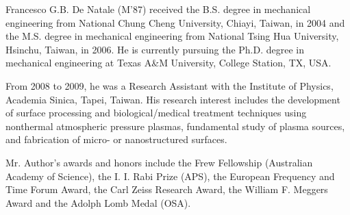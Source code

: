 \documentclass{ieeeaccess}
\begin{document}
\begin{IEEEbiography}{Francesco G.B. De Natale} (M'87) received the B.S. degree in mechanical 
engineering from National Chung Cheng University, Chiayi, Taiwan, in 2004 
and the M.S. degree in mechanical engineering from National Tsing Hua 
University, Hsinchu, Taiwan, in 2006. He is currently pursuing the Ph.D. 
degree in mechanical engineering at Texas A{\&}M University, College 
Station, TX, USA.

From 2008 to 2009, he was a Research Assistant with the Institute of 
Physics, Academia Sinica, Tapei, Taiwan. His research interest includes the 
development of surface processing and biological/medical treatment 
techniques using nonthermal atmospheric pressure plasmas, fundamental study 
of plasma sources, and fabrication of micro- or nanostructured surfaces. 

Mr. Author's awards and honors include the Frew Fellowship (Australian 
Academy of Science), the I. I. Rabi Prize (APS), the European Frequency and 
Time Forum Award, the Carl Zeiss Research Award, the William F. Meggers 
Award and the Adolph Lomb Medal (OSA).
\end{IEEEbiography}

\EOD
\end{document}
